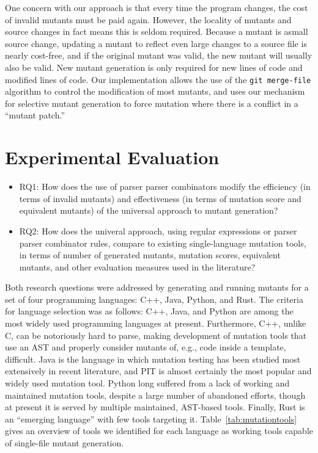 \documentclass[acmsmall,screen,review,anonymous]{acmart}
\begin{document}
{One concern with our approach is that every time the
program changes, the cost of invalid mutants must be paid again.
However, the locality of mutants and source changes in fact means this
is seldom required.   Because a mutant is asmall source change, updating a mutant to
reflect even large changes to a source file is nearly cost-free, and if the
original mutant was valid, the new mutant will usually also be valid.
New mutant generation is only required for new lines of code and
modified lines of code.  Our
implementation allows the use of the {\tt git merge-file} algorithm to control the
modification of most mutants, and uses our mechanism for
selective mutant generation to force mutation where
there is a conflict in a ``mutant patch.''


\section{Experimental Evaluation}

\begin{itemize}

  \item{RQ1:}  How does the use of parser parser combinators modify 
    the efficiency (in terms of invalid mutants) and effectiveness (in
    terms of mutation score and equivalent mutants) of the universal
    approach to mutant generation?

\item{RQ2:}  How does the univeral approach, using regular expressions
  or parser parser combinator rules, compare to existing
  single-language mutation tools, in terms of number of generated
  mutants, mutation scores, equivalent mutants, and other evaluation measures used in the literature?

\end{itemize}


Both research questions were addressed by generating and running
mutants for a set of four programming languages: C++, Java, Python,
and Rust.  The criteria for language selection was as follows: C++,
Java, and Python are among the most widely used programming languages
at present.  Furthermore, C++, unlike C, can be notoriously hard to
parse, making development of mutation tools that use an AST and
properly consider mutants of, e.g., code inside a template,
difficult.  Java is the language in which mutation testing has been
studied most extensively in recent literature, and PIT is almost
certainly the most popular and widely used mutation tool.  Python long
suffered from a lack of working and maintained mutation tools, despite
a large number of abandoned efforts, though at present it is served by
multiple maintained, AST-based tools.  Finally, Rust is an ``emerging
language'' with few tools targeting it.  Table~\ref{tab:mutationtools}
gives an overview of tools we identified for each language as working tools
capable of single-file mutant generation.

}
\end{document}
